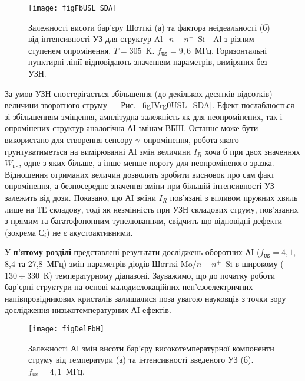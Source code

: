 \begin{figure}
\center
\texttt{[image: figFbUSL\_SDA]}
\caption{\label{figFbUSL_SDA}
Залежності висоти бар'єру Шотткі (а) та фактора неідеальності (б)  від інтенсивності УЗ для
структур Al$-n-n^+$--Si---Al з різним ступенем опромінення.
$T=305$~K.
$f_\mathtt{US}=9,6$~МГц.
Горизонтальні пунктирні лінії відповідають значенням параметрів, виміряних без УЗН.
}%
\end{figure}

За умов УЗН спостерігається збільшення (до декількох десятків відсотків) величини зворотного струму --- Рис.~\ref{figIVrg0USL_SDA}.
Ефект послаблюється зі збільшенням зміщення, амплітудна залежність як для неопромінених, так і опромінених структур аналогічна АІ змінам ВБШ.
Останнє може бути використано для створення сенсору $\gamma$--опромінення,
робота якого грунтуватиметься на вимірюванні АІ змін величини $I_R$ хоча б при двох значеннях $W_\mathtt{US}$,
одне з яких більше, а інше менше порогу для неопроміненого зразка.
Відношення отриманих величин дозволить зробити висновок про сам факт опромінення,
а безпосереднє значення зміни при більшій інтенсивності УЗ залежить від дози.
Показано, що АІ зміни $I_R$ пов'язані з впливом пружних хвиль лише на ТЕ складову,
тоді як незмінність при УЗН складових струму, пов’язаних з прямим та багатофононним тунелюванням,
свідчить що відповідні дефекти (зокрема С$_i$) не є акустоактивними.


У  \underline{\textbf{п'ятому розділі}} представлені результати досліджень
оборотних АІ ($f_\mathtt{US}=4,1$, 8,4 та 27,8~МГц) змін параметрів діодів Шотткі Mo$/n-n^+$--Si в широкому ($130\div330$~К) температурному діапазоні.
Зауважимо, що до початку роботи бар'єрні структури на основі малодислокаційних неп'єзоелектричних напівпровідникових кристалів
залишалися поза увагою науковців з точки зору дослідження низькотемпературних АІ ефектів.

\begin{figure}
\center
\texttt{[image: figDelFbH]}
\caption{\label{figDelFbH}
Залежності АІ змін висоти бар'єру високотемпературної компоненти струму від температури (а) та інтенсивності введеного УЗ (б).
$f_\mathtt{US}=4,1$~МГц.
}%
\end{figure}

